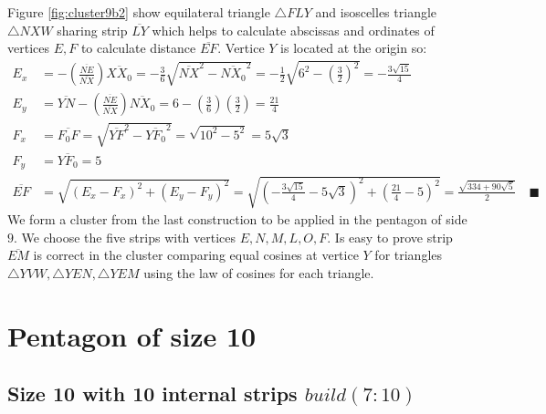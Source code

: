\documentclass[11pt]{article}
\begin{document}
Figure \ref{fig:cluster9b2} show equilateral triangle $\triangle{FLY}$ and isoscelles triangle $\triangle{NXW}$ sharing strip $\overline{LY}$ which helps to calculate abscissas and ordinates of vertices $E,F$ to calculate distance $\overline{EF}$. Vertice $Y$ is located at the origin so:
\begin{align}
E_x &= - \left(\frac{\overline{NE}}{\overline{NX}}\right)\overline{XX_0}
 = -\frac{3}6\sqrt{\overline{NX}^2 - \overline{NX_0}^2}
 = -\frac{1}{2}\sqrt{6^2 - \left(\frac{3}2\right)^2} = -\frac{3\sqrt{15}}4 \\
E_y &= \overline{YN} - \left(\frac{\overline{NE}}{\overline{NX}}\right)\overline{NX_0}
 = 6 - \left(\frac{3}6\right)\left(\frac{3}2\right) = \frac{21}4\\
F_x &= \overline{F_0F} = \sqrt{\overline{YF}^2 - \overline{YF_0}^2}
 = \sqrt{10^2 - 5^2} = 5\sqrt3\\
F_y &= \overline{YF_0} = 5\\
\overline{EF} &= \sqrt{(E_x - F_x)^2 + (E_y - F_y)^2}
 = \sqrt{\left(-\frac{3\sqrt{15}}{4} -5\sqrt3 \right)^2 + \left(\frac{21}4 - 5\right)^2}
 = \frac{\sqrt{334+90\sqrt5}}2 \quad\blacksquare
\end{align}
We form a cluster from the last construction to be applied in the pentagon of side $9$. We choose the five strips with vertices $E,N,M,L,O,F$. Is easy to prove strip $\overline{EM}$ is correct in the cluster comparing equal cosines at vertice $Y$ for triangles $\triangle{YVW},\triangle{YEN},\triangle{YEM}$ using the law of cosines for each triangle.



\section{Pentagon of size 10}

\subsection{Size 10 with 10 internal strips $build(7:10)$}
\end{document}
